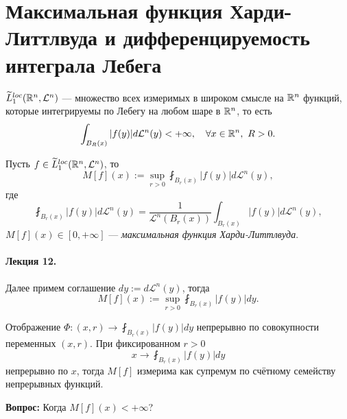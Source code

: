 \section{Максимальная функция Харди-Литтлвуда и дифференцируемость интеграла Лебега}
\begin{definition}
    $\widetilde{L}_1^{loc}(\mathbb{R}^n, \mathcal{L}^n)$ — множество всех измеримых в широком смысле на $\mathbb{R}^n$ функций, которые интегрируемы по Лебегу на любом шаре в $\mathbb{R}^n$, то есть
    \[\int_{B_R(x)} |f(y)|d\mathcal{L}^n(y) < +\infty, \quad \forall x \in \mathbb{R}^n, \ R > 0.\]
\end{definition} 
\begin{definition}
    Пусть $f \in \widetilde{L}_1^{loc}(\mathbb{R}^n, \mathcal{L}^n)$, то $$M[f](x) := \sup\limits_{r>0} \fint_{B_r(x)}|f(y)|d \mathcal{L}^n(y),$$
    где
    \[\fint_{B_r(x)}|f(y)|d \mathcal{L}^n(y) = \frac{1}{\mathcal{L}^n(B_r(x))} \int_{B_r(x)} |f(y)|d \mathcal{L}^n(y),\]
    $M[f](x) \in [0, +\infty]$ — \textit{максимальная функция Харди-Литтлвуда}.
\end{definition}


\paragraph{Лекция 12.}

\begin{remark}
    Далее примем соглашение $dy:=d \mathcal{L}^n(y)$, тогда
    \[M[f](x):= \sup_{r>0} \fint_{B_r(x)} |f(y)|dy.\]
\end{remark}

\begin{remark}
    Отображение $\Phi: (x,r) \to \fint_{B_r(x)} |f(y)|dy$ непрерывно по совокупности переменных $(x,r)$.
    При фиксированном $r>0$
    \[x \to \fint_{B_r(x)}|f(y)|dy\]
    непрерывно по $x$, тогда $M[f]$ измерима как супремум по счётному семейству непрерывных функций.
\end{remark}

\noindent \textbf{Вопрос:} Когда $M[f](x)<+\infty$?

